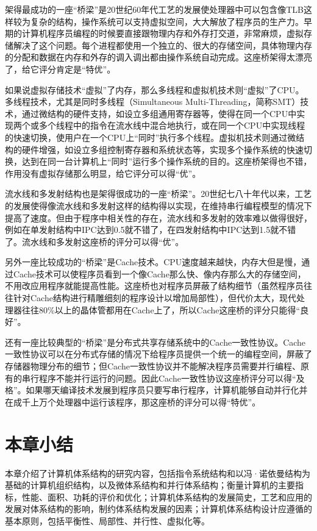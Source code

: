 \documentclass[]{ctexbook}
\begin{document}
架得最成功的一座``桥梁''是20世纪60年代工艺的发展使处理器中可以包含像TLB这样较为复杂的结构，操作系统可以支持虚拟空间，大大解放了程序员的生产力。早期的计算机程序员编程的时候要直接跟物理内存和外存打交道，非常麻烦，虚拟存储解决了这个问题。每个进程都使用一个独立的、很大的存储空间，具体物理内存的分配和数据在内存和外存的调入调出都由操作系统自动完成。这座桥架得太漂亮了，给它评分肯定是``特优''。

如果说虚拟存储技术``虚拟''了内存，那么多线程和虚拟机技术则``虚拟''了CPU。多线程技术，尤其是同时多线程（Simultaneous Multi-Threading，简称SMT）技术，通过微结构的硬件支持，如设立多组通用寄存器等，使得在同一个CPU中实现两个或多个线程中的指令在流水线中混合地执行，或在同一个CPU中实现线程的快速切换，使用户在一个CPU上``同时''执行多个线程。虚拟机技术则通过微结构的硬件增强，如设立多组控制寄存器和系统状态等，实现多个操作系统的快速切换，达到在同一台计算机上``同时''运行多个操作系统的目的。这座桥架得也不错，作用没有虚拟存储那么明显，给它评分可以得``优''。

流水线和多发射结构也是架得很成功的一座``桥梁''。20世纪七八十年代以来，工艺的发展使得像流水线和多发射这样的结构得以实现，在维持串行编程模型的情况下提高了速度。但由于程序中相关性的存在，流水线和多发射的效率难以做得很好，例如在单发射结构中IPC达到0.5就不错了，在四发射结构中IPC达到1.5就不错了。流水线和多发射这座桥的评分可以得``优''。

另外一座比较成功的``桥梁''是Cache技术。CPU速度越来越快，内存大但是慢，通过Cache技术可以使程序员看到一个像Cache那么快、像内存那么大的存储空间，不用改应用程序就能提高性能。这座桥也对程序员屏蔽了结构细节（虽然程序员往往针对Cache结构进行精雕细刻的程序设计以增加局部性），但代价太大，现代处理器往往80\%以上的晶体管都用在Cache上了，所以Cache这座桥的评分只能得``良好''。

还有一座比较典型的``桥梁''是分布式共享存储系统中的Cache一致性协议。Cache一致性协议可以在分布式存储的情况下给程序员提供一个统一的编程空间，屏蔽了存储器物理分布的细节；但Cache一致性协议并不能解决程序员需要并行编程、原有的串行程序不能并行运行的问题。因此Cache一致性协议这座桥评分可以得``及格''。如果哪天编译技术发展到程序员只要写串行程序，计算机能够自动并行化并在成千上万个处理器中运行该程序，那这座桥的评分可以得``特优''。

\hypertarget{ux672cux7ae0ux5c0fux7ed3}{%
\section{本章小结}\label{ux672cux7ae0ux5c0fux7ed3}}

本章介绍了计算机体系结构的研究内容，包括指令系统结构和以冯·诺依曼结构为基础的计算机组织结构，以及微体系结构和并行体系结构；衡量计算机的主要指标，性能、面积、功耗的评价和优化；计算机体系结构的发展简史，工艺和应用的发展对体系结构的影响，制约体系结构发展的因素；计算机体系结构设计应遵循的基本原则，包括平衡性、局部性、并行性、虚拟化等。
\end{document}
